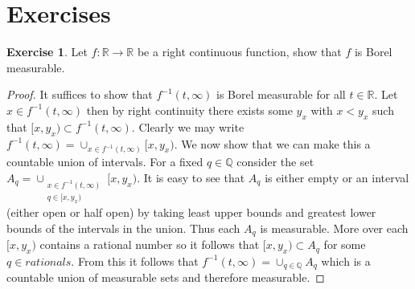 \documentclass{amsbook}
\theoremstyle{definition}
\newtheorem{xca}{Exercise}
\theoremstyle{remark}
\newcommand{\reals}{\mathbb{R}}
\newcommand{\rationals}{\mathbb{Q}}
\begin{document}
\section{Exercises}
\begin{xca}Let $f : \reals \to \reals$ be a right continuous function,
  show that $f$ is Borel measurable.
\end{xca}
\begin{proof}
It suffices to show that $f^{-1}(t, \infty)$ is Borel measurable for
all $t \in \reals$.  Let $x \in f^{-1}(t, \infty)$ then by right
continuity there exists some $y_x$ with $x < y_x$ such that $[x,y_x) \subset
f^{-1}(t, \infty)$.  Clearly we may write $f^{-1}(t, \infty) = \cup_{x
  \in f^{-1}(t, \infty)} [x, y_x)$.  We now show that we can make this
a countable union of intervals.  For a fixed $q \in \rationals$
consider the set $A_q = \cup_{\substack{x \in f^{-1}(t, \infty) \\ q
    \in [x, y_x)}} [x, y_x)$.  It is easy to see that $A_q$ is either
empty or an
interval (either open or half open) by taking least upper bounds and
greatest lower bounds of the intervals in the union.  Thus each $A_q$
is measurable.  More over each $[x,y_x)$ contains a rational number so
it follows that $[x,y_x) \subset A_q$ for some $q \in rationals$.
From this it follows that $f^{-1}(t, \infty) = \cup_{q \in
  \rationals}A_q$ which is a countable union of measurable sets and
therefore measurable.
\end{proof}
\end{document}
